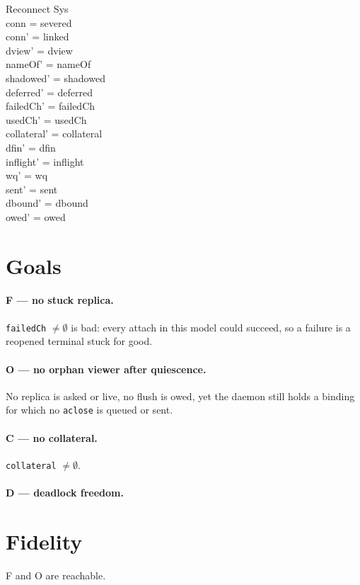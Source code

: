 \documentclass[a4paper,10pt,fleqn]{article}
\begin{document}
\begin{schema}{Reconnect}
  \Delta Sys \\
\where
  conn = severed \\
  conn' = linked \\
  dview' = dview \\
  nameOf' = nameOf \\
  shadowed' = shadowed \\
  deferred' = deferred \\
  failedCh' = failedCh \\
  usedCh' = usedCh \\
  collateral' = collateral \\
  dfin' = dfin \\
  inflight' = inflight \\
  wq' = wq \\
  sent' = sent \\
  dbound' = dbound \\
  owed' = owed
\end{schema}


\section{Goals}

\paragraph{F --- no stuck replica.}  \texttt{failedCh} $\neq \emptyset$ is bad:
every attach in this model could succeed, so a failure is a reopened
terminal stuck for good.

\paragraph{O --- no orphan viewer after quiescence.}  No replica is asked or
live, no flush is owed, yet the daemon still holds a binding for which no
\texttt{aclose} is queued or sent.

\paragraph{C --- no collateral.}  \texttt{collateral} $\neq \emptyset$.

\paragraph{D --- deadlock freedom.}

\section{Fidelity}

F and O are reachable.
\end{document}
